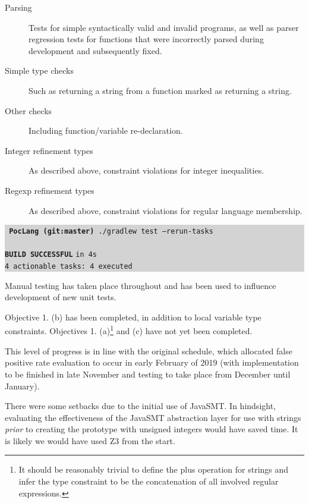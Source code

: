 \documentclass[a4paper]{article}
\newcommand{\termbox}[1] {\colorbox{lightgrey}{\parbox{\textwidth}{\vspace{.75\baselineskip}\centering\parbox{0.95\textwidth}{ \sffamily#1\vspace{.75\baselineskip}}}}}
\begin{document}
\begin{description}
    \item[Parsing] Tests for simple syntactically valid and invalid programs, as well as parser regression tests for functions that were incorrectly parsed during development and subsequently fixed.
    \item[Simple type checks] Such as returning a string from a function marked as returning a string.
    \item[Other checks] Including function/variable re-declaration.
    \item[Integer refinement types] As described above, constraint violations for integer inequalities.
    \item[Regexp refinement types] As described above, constraint violations for regular language membership.
\end{description}

\termbox{
    \texttt{\textcolor{term-green}{} \ttfamily \textbf{\textcolor{term-dir}{PocLang} \textcolor{term-git}{(git:}\textcolor{term-branch}{master}\textcolor{term-git}{)}} ./gradlew test --rerun-tasks}\\\\

    \textcolor{term-green}{\textbf{\texttt{BUILD SUCCESSFUL}}} \texttt{in 4s}\\
    \texttt{4 actionable tasks: 4 executed}
}

Manual testing has taken place throughout and has been used to influence development of new unit tests.

Objective 1. (b) has been completed, in addition to local variable type constraints. Objectives 1. (a)\footnote{It should be reasonably trivial to define the plus operation for strings and infer the type constraint to be the concatenation of all involved regular expressions.} and (c) have not yet been completed.

This level of progress is in line with the original schedule, which allocated false positive rate evaluation to occur in early February of 2019 (with implementation to be finished in late November and testing to take place from December until January).

There were some setbacks due to the initial use of JavaSMT. In hindsight, evaluating the effectiveness of the JavaSMT abstraction layer for use with strings \emph{prior} to creating the prototype with unsigned integers would have saved time. It is likely we would have used Z3 from the start.
\end{document}
